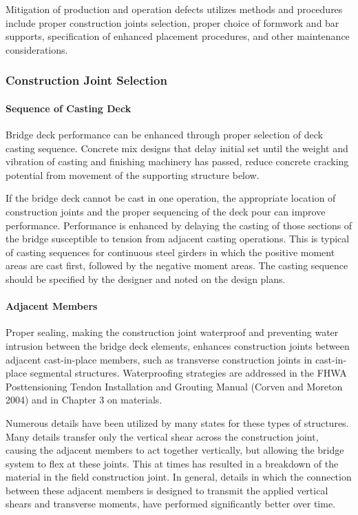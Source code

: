 Mitigation of production and operation defects utilizes methods and procedures include proper construction
joints selection, proper choice of formwork and bar supports, specification of enhanced placement procedures, and
other maintenance considerations.

\subsubsection{Construction Joint Selection}
\paragraph{Sequence of Casting Deck}
Bridge deck performance can be enhanced through proper selection of deck casting sequence. Concrete mix
designs that delay initial set until the weight and vibration of casting and finishing machinery has passed, reduce
concrete cracking potential from movement of the supporting structure below.

If the bridge deck cannot be cast in one operation, the appropriate location of construction joints and the proper
sequencing of the deck pour can improve performance. Performance is enhanced by delaying the casting of those
sections of the bridge susceptible to tension from adjacent casting operations. This is typical of casting sequences for
continuous steel girders in which the positive moment areas are cast first, followed by the negative moment areas.
The casting sequence should be specified by the designer and noted on the design plans.

\paragraph{Adjacent Members}
Proper sealing, making the construction joint waterproof and preventing water intrusion between the bridge deck
elements, enhances construction joints between adjacent cast-in-place members, such as transverse construction
joints in cast-in-place segmental structures. Waterproofing strategies are addressed in the FHWA Posttensioning
Tendon Installation and Grouting Manual (Corven and Moreton 2004) and in Chapter 3 on materials.

Numerous details have been utilized by many states for these types of structures. Many details transfer only the
vertical shear across the construction joint, causing the adjacent members to act together vertically, but allowing the
bridge system to flex at these joints. This at times has resulted in a breakdown of the material in the field construction
joint. In general, details in which the connection between these adjacent members is designed to transmit the applied
vertical shears and transverse moments, have performed significantly better over time.

